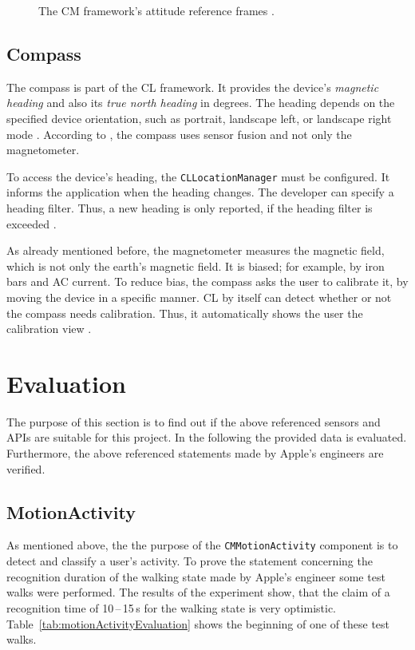 \begin{figure}
      
	\caption{The \acl{CM} framework's attitude reference frames \citep{apple:wwdc_2012_pham}.}
	\label{fig:cm_referenceframes}
\end{figure}


\subsection{Compass}
The compass is part of the \ac{CL} framework. It provides the device's \emph{magnetic heading} and also its \emph{true north heading} in degrees. The heading depends on the specified device orientation, such as portrait, landscape left, or landscape right mode \citep{apple:ios_doc_cl}. According to \citet{apple:wwdc_2012_pham}, the compass uses sensor fusion and not only the magnetometer.

To access the device's heading, the \texttt{CLLocationManager} must be configured. It informs the application when the heading changes. The developer can specify a heading filter. Thus, a new heading is only reported, if the heading filter is exceeded \citep{apple:ios_doc_cl}.

As already mentioned before, the magnetometer measures the magnetic field, which is not only the earth's magnetic field. It is biased; for example, by iron bars and AC current. To reduce bias, the compass asks the user to calibrate it, by moving the device in a specific manner. \ac{CL} by itself can detect whether or not the compass needs calibration. Thus, it automatically shows the user the calibration view \citep{apple:ios_doc_cl}.


\section{Evaluation}\label{sec:sensor_eval}
The purpose of this section is to find out if the above referenced sensors and \acsp{API} are suitable for this project. In the following the provided data is evaluated. Furthermore, the above referenced statements made by Apple's engineers are verified.


\subsection{MotionActivity}
As mentioned above, the the purpose of the \texttt{CMMotionActivity} component is to detect and classify a user's activity. To prove the statement concerning the recognition duration of the walking state made by Apple's engineer \citet{apple:wwdc_2014_pham} some test walks were performed. The results of the experiment show, that the claim of a recognition time of 10\,--\,15\,s for the walking state is very optimistic. Table~\ref{tab:motionActivityEvaluation} shows the beginning of one of these test walks.

